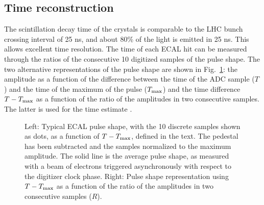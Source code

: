\documentclass[journal]{IEEEtran}
\begin{document}
\subsection{Time reconstruction}
The scintillation decay time of the crystals is comparable to the LHC bunch crossing interval of 25 ns, and about 80\% of the light is emitted in 25 ns. This allows excellent time resolution. The time of each ECAL hit can be measured through the ratios of the consecutive 10 digitized samples of the pulse shape. The two alternative representations of the pulse shape are shown in Fig.~\ref{fig:pulse_shapes_funcs}: the amplitude as a function of the difference between the time of the ADC sample ($T$) and the time of the maximum of the pulse ($T_{\rm max}$) and the time difference $T-T_{\rm max}$ as a function of the ratio of the amplitudes in two consecutive samples. The latter is used for the time estimate \cite{Chatrchyan:2009aj}.  
%
\begin{figure}[!t]
  \begin{center}
    \caption{Left: Typical ECAL pulse shape, with the 10 discrete samples shown as dots, as a function of $T-T_{\rm max}$, defined in the text. The pedestal has been subtracted and the samples normalized to the maximum amplitude. The solid line is the average pulse shape, as measured with a beam of electrons triggered asynchronously with respect to the digitizer clock phase. Right: Pulse shape representation using $T-T_{\rm max}$ as a function of the ratio of the amplitudes in two consecutive samples ($R$). \label{fig:pulse_shapes_funcs}}
  \end{center}
\end{figure}
%
\end{document}
